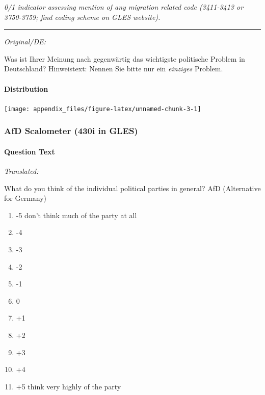 \documentclass[
]{article}
\providecommand{\tightlist}{%
  \setlength{\itemsep}{0pt}\setlength{\parskip}{0pt}}
\begin{document}
\emph{0/1 indicator assessing mention of any migration related code (3411-3413 or 3750-3759; find coding scheme on GLES website).}

\begin{center}\rule{0.5\linewidth}{0.5pt}\end{center}

\emph{Original/DE:}

Was ist Ihrer Meinung nach gegenwärtig das wichtigste politische Problem in Deutschland?
Hinweistext: Nennen Sie bitte nur ein \emph{einziges} Problem.

\hypertarget{distribution-2}{%
\paragraph{Distribution}\label{distribution-2}}

\begin{center}\texttt{[image: appendix\_files/figure-latex/unnamed-chunk-3-1]} \end{center}

\hypertarget{afd-scalometer-430i-in-gles}{%
\subsubsection{AfD Scalometer (430i in GLES)}\label{afd-scalometer-430i-in-gles}}

\hypertarget{question-text-3}{%
\paragraph{Question Text}\label{question-text-3}}

\emph{Translated:}

What do you think of the individual political parties in general? AfD (Alternative for Germany)

\begin{enumerate}
\def\labelenumi{(\arabic{enumi})}
\tightlist
\item
  -5 don't think much of the party at all
\item
  -4
\item
  -3
\item
  -2
\item
  -1
\item
  0
\item
  +1
\item
  +2
\item
  +3
\item
  +4
\item
  +5 think very highly of the party
\end{enumerate}
\end{document}
